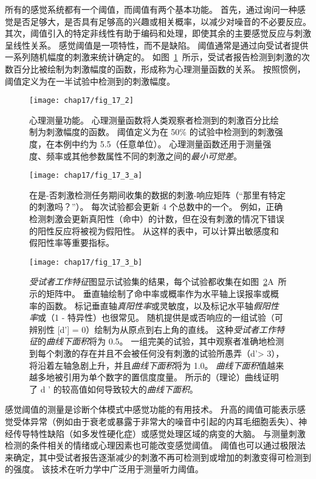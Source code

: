 所有的感觉系统都有一个阈值，而阈值有两个基本功能。 
首先，通过询问一种感觉是否足够大，是否具有足够高的兴趣或相关概率，以减少对噪音的不必要反应。
其次，阈值引入的特定非线性有助于编码和处理，即使其余的主要感觉反应与刺激呈线性关系。
感觉阈值是一项特性，而不是缺陷。 
阈值通常是通过向受试者提供一系列随机幅度的刺激来统计确定的。
如图~\ref{fig:17_2}~所示，受试者报告检测到刺激的次数百分比被绘制为刺激幅度的函数，形成称为心理测量函数的关系。
按照惯例，阈值定义为在一半试验中检测到的刺激幅度。


\begin{figure}[htbp]
	\centering
	\texttt{[image: chap17/fig\_17\_2]}
	\caption{心理测量功能。
		心理测量函数将人类观察者检测到的刺激百分比绘制为刺激幅度的函数。 
		阈值定义为在 50\% 的试验中检测到的刺激强度，在本例中约为 5.5（任意单位）。 
		心理测量函数还用于测量强度、频率或其他参数属性不同的刺激之间的\textit{最小可觉差}。}
	\label{fig:17_2}
\end{figure}


\begin{figure}[htbp]
	\centering
	\texttt{[image: chap17/fig\_17\_3\_a]}
	\caption{在是-否刺激检测任务期间收集的数据的刺激-响应矩阵（“那里有特定的刺激吗？”）。
		每次试验都会更新 4 个总数中的一个。
		例如，正确检测刺激会更新真阳性（命中）的计数，但在没有刺激的情况下错误的阳性反应将被视为假阳性。
		从这样的表中，可以计算出敏感度和假阳性率等重要指标。}
	\label{fig:17_3_a}
\end{figure}


\begin{figure}[htbp]
	\centering
	\texttt{[image: chap17/fig\_17\_3\_b]}
	\caption{\textit{受试者工作特征}图显示试验集的结果，每个试验都收集在如图~\ref{fig:17_3_a}A~所示的矩阵中。
		垂直轴绘制了命中率或概率作为水平轴上误报率或概率的函数。
		标记垂直轴\textit{真阳性率}或灵敏度，以及标记水平轴\textit{假阳性率}或（1 - 特异性）也很常见。
		随机提供是或否响应的一组试验（可辨别性 [d'] = 0）绘制为从原点到右上角的直线。
		这种\textit{受试者工作特征}的\textit{曲线下面积}将为 0.5。
		一组完美的试验，其中观察者准确地检测到每个刺激的存在并且不会被任何没有刺激的试验所愚弄（d'> 3），将沿着左轴急剧上升，并且\textit{曲线下面积}将为 1.0。
		\textit{曲线下面积}值越来越多地被引用为单个数字的置信度度量。
		所示的（理论）曲线证明了 d ' 的较高值如何导致较大的\textit{曲线下面积}\cite{swets1973relative}。}
	\label{fig:17_3_b}
\end{figure}


感觉阈值的测量是诊断个体模式中感觉功能的有用技术。 
升高的阈值可能表示感觉受体异常（例如由于衰老或暴露于非常大的噪音中引起的内耳毛细胞丢失）、神经传导特性缺陷（如多发性硬化症）或感觉处理区域的病变的大脑。
与测量刺激检测的条件相关的情绪或心理因素也可能改变感觉阈值。
阈值也可以通过极限法来确定，其中受试者报告逐渐减少的刺激不再可检测到或增加的刺激变得可检测到的强度。
该技术在听力学中广泛用于测量听力阈值。


